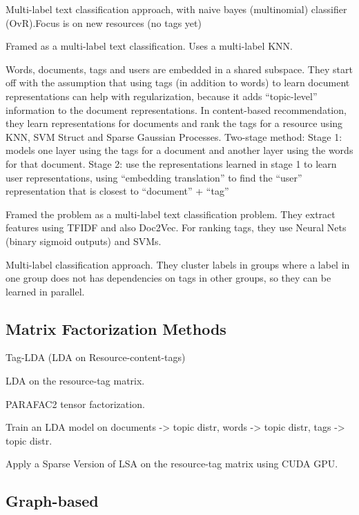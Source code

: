 \cite{yagnik_etal_2014} 
Multi-label text classification approach, with naive bayes (multinomial) classifier (OvR).Focus is on new resources (no tags yet)

\cite{charte_etal_2015}

Framed as a multi-label text classification. Uses a multi-label KNN.

\cite{kataria_agarwal_2015}
Words, documents, tags and users are embedded in a shared subspace.
They start off with the assumption that using tags (in addition to words) to learn document representations can help with regularization, because it adds “topic-level” information to the document representations.
In content-based recommendation, they learn representations for documents and rank the tags for a resource using KNN, SVM Struct and Sparse Gaussian Processes.
Two-stage method:
Stage 1: models one layer using the tags for a document and another layer using the words for that document.
Stage 2: use the representations learned in stage 1 to learn user representations, using “embedding translation” to find the “user” representation that is closest to “document” + “tag”

\cite{tao_yao_2016}

Framed the problem as a multi-label text classification problem. They extract features using TFIDF and also Doc2Vec. For ranking tags, they use Neural Nets (binary sigmoid outputs) and SVMs.

\cite{barezi_etal_2017}
Multi-label classification approach. They cluster labels in groups where a label in one group does not has dependencies on tags in other groups, so they can be learned in parallel.

\subsection{Matrix Factorization Methods}

\cite{si_sun_2008} Tag-LDA (LDA on Resource-content-tags)

\cite{bundschus_etal_2009} LDA on the resource-tag matrix.

\cite{panagakis_kotropoulos_2011} PARAFAC2 tensor factorization.

\cite{hu_etal_2012} Train an LDA model on documents -> topic distr, words -> topic distr, tags -> topic distr.

\cite{zhang_etal_2014} Apply a Sparse Version of LSA on the resource-tag matrix using CUDA GPU.


\subsection{Graph-based}

